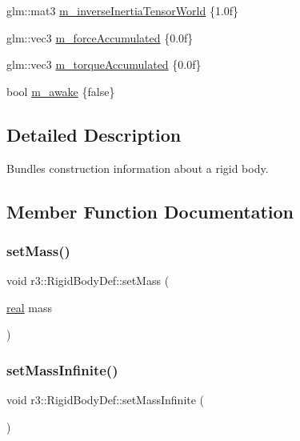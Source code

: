 \begin{DoxyCompactItemize}
\item 
glm\+::mat3 \mbox{\hyperlink{structr3_1_1_rigid_body_def_acf08b5556bde4c822264a7dc6c180e90}{m\+\_\+inverse\+Inertia\+Tensor\+World}} \{1.\+0f\}
\item 
glm\+::vec3 \mbox{\hyperlink{structr3_1_1_rigid_body_def_ae3b46fdab5cf6b6d6724794a1d3b3cdb}{m\+\_\+force\+Accumulated}} \{0.\+0f\}
\item 
glm\+::vec3 \mbox{\hyperlink{structr3_1_1_rigid_body_def_ab12c90dd6547748d3d7f27e53833a9e6}{m\+\_\+torque\+Accumulated}} \{0.\+0f\}
\item 
bool \mbox{\hyperlink{structr3_1_1_rigid_body_def_a3d48ea179d5ebc3a906949a623236c5a}{m\+\_\+awake}} \{false\}
\end{DoxyCompactItemize}


\subsection{Detailed Description}
Bundles construction information about a rigid body. 

\subsection{Member Function Documentation}
\mbox{\label{structr3_1_1_rigid_body_def_a7b84fd988312a41f84ac0505f6c3de47}} 
\subsubsection{\texorpdfstring{set\+Mass()}{setMass()}}
{\footnotesize\ttfamily void r3\+::\+Rigid\+Body\+Def\+::set\+Mass (\begin{DoxyParamCaption}\item[{\mbox{\hyperlink{namespacer3_ab2016b3e3f743fb735afce242f0dc1eb}{real}}}]{mass }\end{DoxyParamCaption})}

\mbox{\label{structr3_1_1_rigid_body_def_a6912018eac59c46be887cf07e7aadc36}} 
\subsubsection{\texorpdfstring{set\+Mass\+Infinite()}{setMassInfinite()}}
{\footnotesize\ttfamily void r3\+::\+Rigid\+Body\+Def\+::set\+Mass\+Infinite (\begin{DoxyParamCaption}{ }\end{DoxyParamCaption})}



